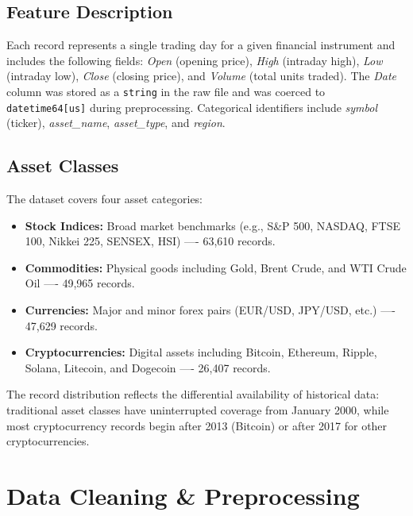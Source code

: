 \documentclass[10pt,a4paper,twocolumn]{article}
\begin{document}
\subsection{Feature Description}

Each record represents a single trading day for a given financial instrument and includes the following fields: \textit{Open} (opening price), \textit{High} (intraday high), \textit{Low} (intraday low), \textit{Close} (closing price), and \textit{Volume} (total units traded). The \textit{Date} column was stored as a \texttt{string} in the raw file and was coerced to \texttt{datetime64[us]} during preprocessing. Categorical identifiers include \textit{symbol} (ticker), \textit{asset\_name}, \textit{asset\_type}, and \textit{region}.

\subsection{Asset Classes}

The dataset covers four asset categories:
\begin{itemize}[leftmargin=1.2em, itemsep=1pt, topsep=2pt]
  \item \textbf{Stock Indices:} Broad market benchmarks (e.g., S\&P 500, NASDAQ, FTSE 100, Nikkei 225, SENSEX, HSI) —- 63,610 records.
  \item \textbf{Commodities:} Physical goods including Gold, Brent Crude, and WTI Crude Oil —- 49,965 records.
  \item \textbf{Currencies:} Major and minor forex pairs (EUR/USD, JPY/USD, etc.) —- 47,629 records.
  \item \textbf{Cryptocurrencies:} Digital assets including Bitcoin, Ethereum, Ripple, Solana, Litecoin, and Dogecoin —- 26,407 records.
\end{itemize}

The record distribution reflects the differential availability of historical data: traditional asset classes have uninterrupted coverage from January 2000, while most cryptocurrency records begin after 2013 (Bitcoin) or after 2017 for other cryptocurrencies.

\section{Data Cleaning \& Preprocessing}
\end{document}
